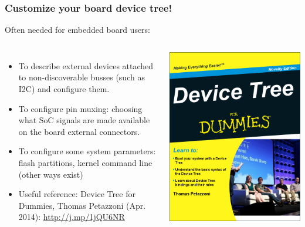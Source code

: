 \begin{frame}
  \frametitle{Customize your board device tree!}
  Often needed for embedded board users:
  \begin{columns}
       \begin{itemize}
       \item To describe external devices attached to non-discoverable
             busses (such as I2C) and configure them.
       \item To configure pin muxing: choosing what SoC signals are
	     made available on the board external connectors.
       \item To configure some system parameters: flash partitions,
	     kernel command line (other ways exist)
       \item Useful reference: Device Tree for Dummies, Thomas Petazzoni (Apr. 2014):
             \url{http://j.mp/1jQU6NR}
       \end{itemize}
    \includegraphics[height=0.6\textheight]{slides/sysdev-linux-intro-cross-compilation/device-tree-for-dummies.png}
  \end{columns}
\end{frame}

